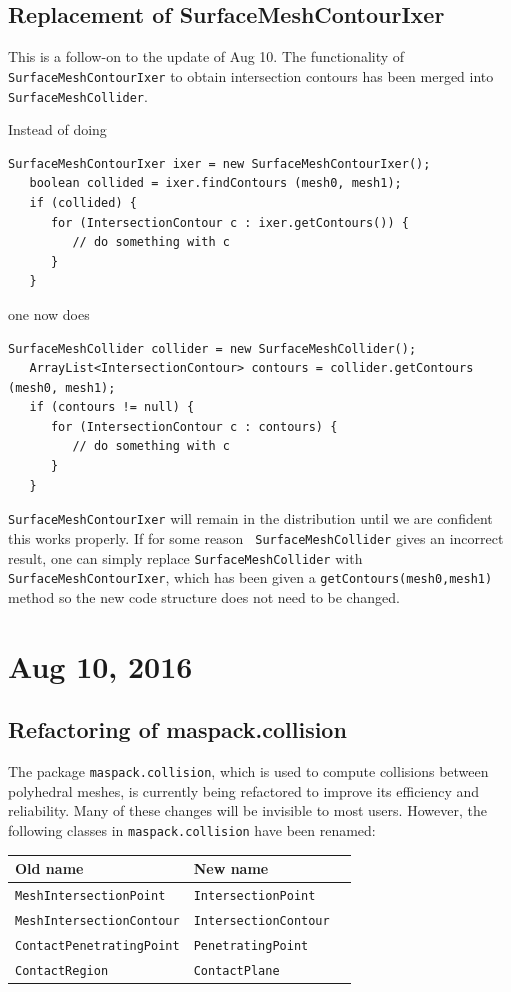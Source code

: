 \documentclass{article}
\begin{document}
\subsection*{Replacement of SurfaceMeshContourIxer}

This is a follow-on to the update of Aug 10. The functionality of {\tt
SurfaceMeshContourIxer} to obtain intersection contours has been
merged into {\tt SurfaceMeshCollider}.

Instead of doing
%
\begin{lstlisting}[]
   SurfaceMeshContourIxer ixer = new SurfaceMeshContourIxer();
   boolean collided = ixer.findContours (mesh0, mesh1);
   if (collided) {
      for (IntersectionContour c : ixer.getContours()) {
         // do something with c
      }
   }
\end{lstlisting}
%
one now does
%
\begin{lstlisting}[]
   SurfaceMeshCollider collider = new SurfaceMeshCollider();
   ArrayList<IntersectionContour> contours = collider.getContours (mesh0, mesh1);
   if (contours != null) {
      for (IntersectionContour c : contours) {
         // do something with c
      }
   }
\end{lstlisting}
%

{\tt SurfaceMeshContourIxer} will remain in the distribution until we
are confident this works properly.  If for some reason {\tt
SurfaceMeshCollider} gives an incorrect result, one can simply replace
{\tt SurfaceMeshCollider} with {\tt SurfaceMeshContourIxer}, which has
been given a {\tt getContours(mesh0,mesh1)} method so the new code
structure does not need to be changed.

\section*{Aug 10, 2016}

\subsection*{Refactoring of maspack.collision}

The package {\tt maspack.collision}, which is used to compute
collisions between polyhedral meshes, is currently being refactored to
improve its efficiency and reliability. Many of these changes will be
invisible to most users. However, the following classes in
{\tt maspack.collision} have been renamed:

\begin{tabular}{lll}
\hline
Old name & New name \\
\hline
{\tt MeshIntersectionPoint} & {\tt IntersectionPoint}\\
{\tt MeshIntersectionContour} & {\tt IntersectionContour}\\
{\tt ContactPenetratingPoint} & {\tt PenetratingPoint}\\
{\tt ContactRegion} & {\tt ContactPlane}\\
\hline
\end{tabular}
\end{document}
